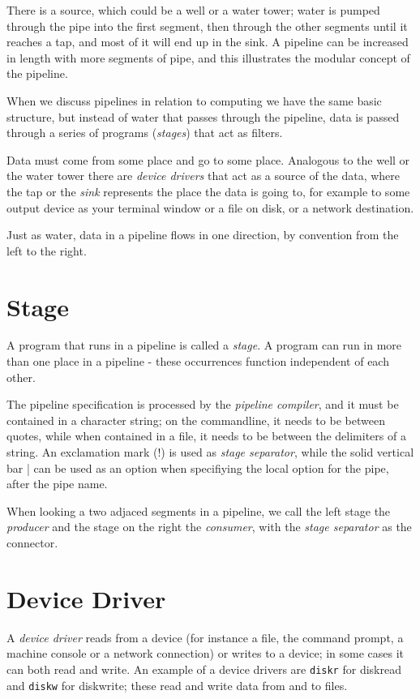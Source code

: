There is a source, which could be a well or a water tower; water is
pumped through the pipe into the first segment, then through the other
segments until it reaches a tap, and most of it will end up in the
sink. A pipeline can be increased in length with more segments of
pipe, and this illustrates the modular concept of the pipeline.

When we discuss pipelines in relation to computing we have the same
basic structure, but instead of water that passes through the
pipeline, data is passed through a series of programs (\emph{stages})
that act as filters.

Data must come from some place and go to some place. Analogous to the
well or the water tower there are \emph{device drivers} that act as a
source of the data, where the tap or the \emph{sink} represents the place the
data is going to, for example to some output device as your terminal
window or a file on disk, or a network destination.

Just as water, data in a pipeline flows in one direction, by
convention from the left to the right.
\section{Stage}
A program that runs in a pipeline is called a \emph{stage}. A program
can run in more than one place in a pipeline - these occurrences
function independent of each other. 

The pipeline specification is processed by the \emph{pipeline
  compiler}, and it must be contained in a character string; on the
commandline, it needs to be between quotes, while when contained in a
file, it needs to be between the delimiters of a \nr{} string. An
exclamation mark (!) is used as \emph{stage separator}, while the
solid vertical bar | can be used as an option when specifiying the
local option for the pipe, after the pipe name.

When looking a two adjaced segments in a pipeline, we call the left
stage the \emph{producer} and the stage on the right the
\emph{consumer}, with the \emph{stage separator} as the connector.
\section{Device Driver}
A \emph{device driver} reads from a device (for instance a file, the
command prompt, a machine console or a network connection) or writes
to a device; in some cases it can both read and write. An example of a
device drivers are \texttt{diskr} for diskread and \texttt{diskw} for
diskwrite; these read and write data from and to files.

